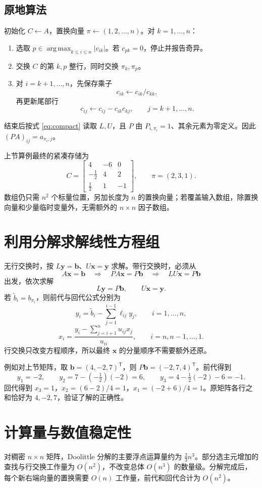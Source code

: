 \documentclass[UTF8,11pt,a4paper,fontset=fandol]{ctexart}
\newcommand{\mat}[1]{\begin{bmatrix}#1\end{bmatrix}}
\begin{document}
\subsection{原地算法}
初始化 $C\gets A$，置换向量 $\pi\gets(1,2,\ldots,n)$。对 $k=1,\ldots,n$：
\begin{enumerate}
\item 选取 $p\in\operatorname{arg\,max}_{k\le i\le n}|c_{ik}|$。若 $c_{pk}=0$，停止并报告奇异。
\item 交换 $C$ 的第 $k,p$ 整行，同时交换 $\pi_k,\pi_p$。
\item 对 $i=k+1,\ldots,n$，先保存乘子
\[
c_{ik}\gets c_{ik}/c_{kk},
\]
再更新尾部行
\[
c_{ij}\gets c_{ij}-c_{ik}c_{kj},\qquad j=k+1,\ldots,n.
\]
\end{enumerate}
结束后按式 \eqref{eq:compact} 读取 $L,U$，且 $P$ 由 $P_{i,\pi_i}=1$、其余元素为零定义。因此 $(PA)_{ij}=a_{\pi_i,j}$。

上节算例最终的紧凑存储为
\[
C=\mat{4&-6&0\\-\frac12&4&2\\\frac12&1&-1},\qquad
\pi=(2,3,1).
\]
数组仍只需 $n^2$ 个标量位置，另加长度为 $n$ 的置换向量；若覆盖输入数组，除置换向量和少量临时变量外，无需额外的 $n\times n$ 因子数组。

\section{利用分解求解线性方程组}
无行交换时，按 $L\mathbf y=\mathbf b$、$U\mathbf x=\mathbf y$ 求解。带行交换时，必须从
\[
A\mathbf x=\mathbf b\quad\Longrightarrow\quad
PA\mathbf x=P\mathbf b\quad\Longrightarrow\quad
LU\mathbf x=P\mathbf b
\]
出发，依次求解
\[
\boxed{L\mathbf y=P\mathbf b,\qquad U\mathbf x=\mathbf y}.
\]
若 $\widetilde b_i=b_{\pi_i}$，则前代与回代公式分别为
\[
y_i=\widetilde b_i-\sum_{j=1}^{i-1}\ell_{ij}y_j,
\qquad i=1,\ldots,n,
\]
\[
x_i=\frac{y_i-\sum_{j=i+1}^{n}u_{ij}x_j}{u_{ii}},
\qquad i=n,n-1,\ldots,1.
\]
行交换只改变方程顺序，所以最终 $\mathbf x$ 的分量顺序不需要额外还原。

例如对上节矩阵，取 $\mathbf b=(4,-2,7)^{\mathsf T}$，则 $P\mathbf b=(-2,7,4)^{\mathsf T}$。前代得到
\[
y_1=-2,\qquad y_2=7-(-\tfrac12)(-2)=6,\qquad
y_3=4-\tfrac12(-2)-6=-1.
\]
回代得到 $x_3=1$，$x_2=(6-2)/4=1$，$x_1=(-2+6)/4=1$。原矩阵各行之和恰好为 $4,-2,7$，验证了解的正确性。

\section{计算量与数值稳定性}
对稠密 $n\times n$ 矩阵，Doolittle 分解的主要浮点运算量约为 $\frac23n^3$。部分选主元增加的查找与行交换工作量为 $O(n^2)$，不改变总体 $O(n^3)$ 的数量级。分解完成后，每个新右端向量的置换需要 $O(n)$ 工作量，前代和回代合计为 $O(n^2)$。
\end{document}
